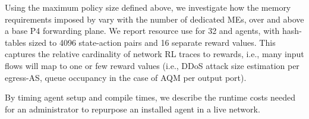 Using the maximum policy size defined above, we investigate how the memory requirements imposed by \approachshort{} vary with the number of dedicated MEs, over and above a base P4 forwarding plane.
We report resource use for \qty{32}{\bit} \Indfw{} and \Coopfw{} agents, with hash-tables sized to \num{4096} state-action pairs and \num{16} separate reward values.
This captures the relative cardinality of network RL traces to rewards, i.e., many input flows will map to one or few reward values (i.e., DDoS attack size estimation per egress-AS, queue occupancy in the case of AQM per output port).


By timing agent setup and compile times, we describe the runtime costs needed for an administrator to repurpose an installed agent in a live network.
